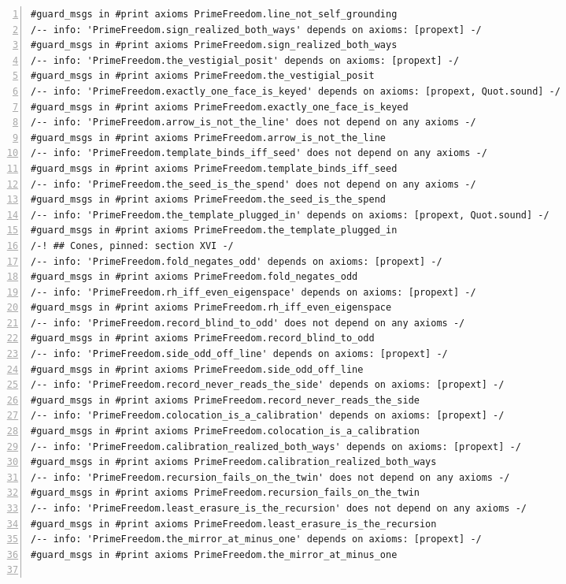 \documentclass[10pt]{article}
\newcommand{\leansize}{\fontsize{5.5pt}{6.75pt}\selectfont}
\begin{document}
\begin{multicols}{2}
\begin{Verbatim}[numbers=left,firstnumber=1,numbersep=3pt,xleftmargin=2.6em,breaklines=true,breakanywhere=true,breakautoindent=false,breakindent=1.4em,breaksymbolleft={},breakanywheresymbolpre={},fontsize=\leansize]
#guard_msgs in #print axioms PrimeFreedom.line_not_self_grounding
/-- info: 'PrimeFreedom.sign_realized_both_ways' depends on axioms: [propext] -/
#guard_msgs in #print axioms PrimeFreedom.sign_realized_both_ways
/-- info: 'PrimeFreedom.the_vestigial_posit' depends on axioms: [propext] -/
#guard_msgs in #print axioms PrimeFreedom.the_vestigial_posit
/-- info: 'PrimeFreedom.exactly_one_face_is_keyed' depends on axioms: [propext, Quot.sound] -/
#guard_msgs in #print axioms PrimeFreedom.exactly_one_face_is_keyed
/-- info: 'PrimeFreedom.arrow_is_not_the_line' does not depend on any axioms -/
#guard_msgs in #print axioms PrimeFreedom.arrow_is_not_the_line
/-- info: 'PrimeFreedom.template_binds_iff_seed' does not depend on any axioms -/
#guard_msgs in #print axioms PrimeFreedom.template_binds_iff_seed
/-- info: 'PrimeFreedom.the_seed_is_the_spend' does not depend on any axioms -/
#guard_msgs in #print axioms PrimeFreedom.the_seed_is_the_spend
/-- info: 'PrimeFreedom.the_template_plugged_in' depends on axioms: [propext, Quot.sound] -/
#guard_msgs in #print axioms PrimeFreedom.the_template_plugged_in
/-! ## Cones, pinned: section XVI -/
/-- info: 'PrimeFreedom.fold_negates_odd' depends on axioms: [propext] -/
#guard_msgs in #print axioms PrimeFreedom.fold_negates_odd
/-- info: 'PrimeFreedom.rh_iff_even_eigenspace' depends on axioms: [propext] -/
#guard_msgs in #print axioms PrimeFreedom.rh_iff_even_eigenspace
/-- info: 'PrimeFreedom.record_blind_to_odd' does not depend on any axioms -/
#guard_msgs in #print axioms PrimeFreedom.record_blind_to_odd
/-- info: 'PrimeFreedom.side_odd_off_line' depends on axioms: [propext] -/
#guard_msgs in #print axioms PrimeFreedom.side_odd_off_line
/-- info: 'PrimeFreedom.record_never_reads_the_side' depends on axioms: [propext] -/
#guard_msgs in #print axioms PrimeFreedom.record_never_reads_the_side
/-- info: 'PrimeFreedom.colocation_is_a_calibration' depends on axioms: [propext] -/
#guard_msgs in #print axioms PrimeFreedom.colocation_is_a_calibration
/-- info: 'PrimeFreedom.calibration_realized_both_ways' depends on axioms: [propext] -/
#guard_msgs in #print axioms PrimeFreedom.calibration_realized_both_ways
/-- info: 'PrimeFreedom.recursion_fails_on_the_twin' does not depend on any axioms -/
#guard_msgs in #print axioms PrimeFreedom.recursion_fails_on_the_twin
/-- info: 'PrimeFreedom.least_erasure_is_the_recursion' does not depend on any axioms -/
#guard_msgs in #print axioms PrimeFreedom.least_erasure_is_the_recursion
/-- info: 'PrimeFreedom.the_mirror_at_minus_one' depends on axioms: [propext] -/
#guard_msgs in #print axioms PrimeFreedom.the_mirror_at_minus_one


\end{Verbatim}
\end{multicols}
\end{document}
